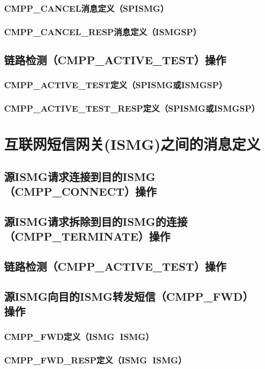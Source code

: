 \documentclass[11pt]{book} %
\begin{document}
\subsubsection{CMPP\_CANCEL消息定义（SP\textrightarrow ISMG）}
\subsubsection{CMPP\_CANCEL\_RESP消息定义（ISMG\textrightarrow SP）}
\subsection{链路检测（CMPP\_ACTIVE\_TEST）操作}
\subsubsection{CMPP\_ACTIVE\_TEST定义（SP\textrightarrow ISMG或ISMG\textrightarrow SP）}
\subsubsection{CMPP\_ACTIVE\_TEST\_RESP定义（SP\textrightarrow ISMG或ISMG\textrightarrow SP）}
\section{互联网短信网关(ISMG)之间的消息定义}
\subsection{源ISMG请求连接到目的ISMG（CMPP\_CONNECT）操作}
\subsection{源ISMG请求拆除到目的ISMG的连接（CMPP\_TERMINATE）操作}

\subsection{链路检测（CMPP\_ACTIVE\_TEST）操作}
\subsection{源ISMG向目的ISMG转发短信（CMPP\_FWD）操作}
\subsubsection{CMPP\_FWD定义（ISMG ISMG）}
\subsubsection{CMPP\_FWD\_RESP定义（ISMG ISMG）}
\end{document}
